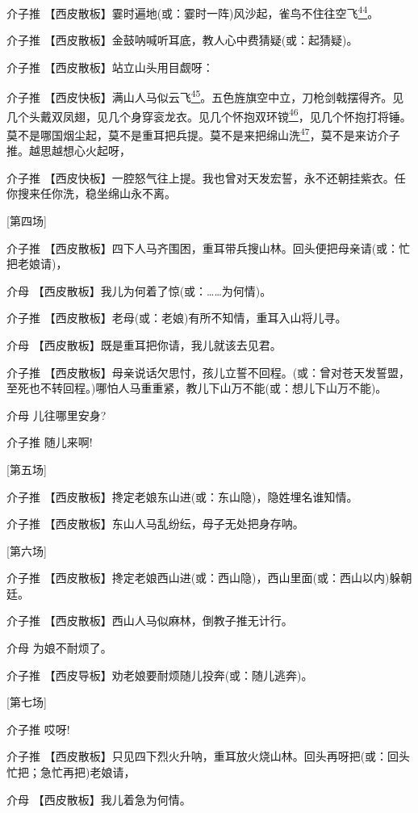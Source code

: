 介子推
【西皮散板】霎时遍地(或：霎时一阵)风沙起，雀鸟不住往空飞\protect\hyperlink{fn44}{\textsuperscript{44}}。

介子推 【西皮散板】金鼓呐喊听耳底，教人心中费猜疑(或：起猜疑)。

介子推 【西皮散板】站立山头用目觑呀：

介子推
【西皮快板】满山人马似云飞\protect\hyperlink{fn45}{\textsuperscript{45}}。五色旌旗空中立，刀枪剑戟摆得齐。见几个头戴双凤翅，见几个身穿衮龙衣。见几个怀抱双环镋\protect\hyperlink{fn46}{\textsuperscript{46}}，见几个怀抱打将锤。莫不是哪国烟尘起，莫不是重耳把兵提。莫不是来把绵山洗\protect\hyperlink{fn47}{\textsuperscript{47}}，莫不是来访介子推。越思越想心火起呀，

介子推
【西皮快板】一腔怒气往上提。我也曾对天发宏誓，永不还朝挂紫衣。任你搜来任你洗，稳坐绵山永不离。

{[}第四场{]}

介子推
【西皮散板】四下人马齐围困，重耳带兵搜山林。回头便把母亲请(或：忙把老娘请)，

介母 【西皮散板】我儿为何着了惊(或：\ldots{}\ldots{}为何情)。

介子推 【西皮散板】老母(或：老娘)有所不知情，重耳入山将儿寻。

介母 【西皮散板】既是重耳把你请，我儿就该去见君。

介子推
【西皮散板】母亲说话欠思忖，孩儿立誓不回程。(或：曾对苍天发誓盟，至死也不转回程。)哪怕人马重重紧，教儿下山万不能(或：想儿下山万不能)。

介母 儿往哪里安身?

介子推 随儿来啊!

{[}第五场{]}

介子推 【西皮散板】搀定老娘东山进(或：东山隐)，隐姓埋名谁知情。

介子推 【西皮散板】东山人马乱纷纭，母子无处把身存呐。

{[}第六场{]}

介子推
【西皮散板】搀定老娘西山进(或：西山隐)，西山里面(或：西山以内)躲朝廷。

介子推 【西皮散板】西山人马似麻林，倒教子推无计行。

介母 为娘不耐烦了。

介子推 【西皮导板】劝老娘要耐烦随儿投奔(或：随儿逃奔)。

{[}第七场{]}

介子推 哎呀!

介子推
【西皮散板】只见四下烈火升呐，重耳放火烧山林。回头再呀把(或：回头忙把；急忙再把)老娘请，

介母 【西皮散板】我儿着急为何情。

